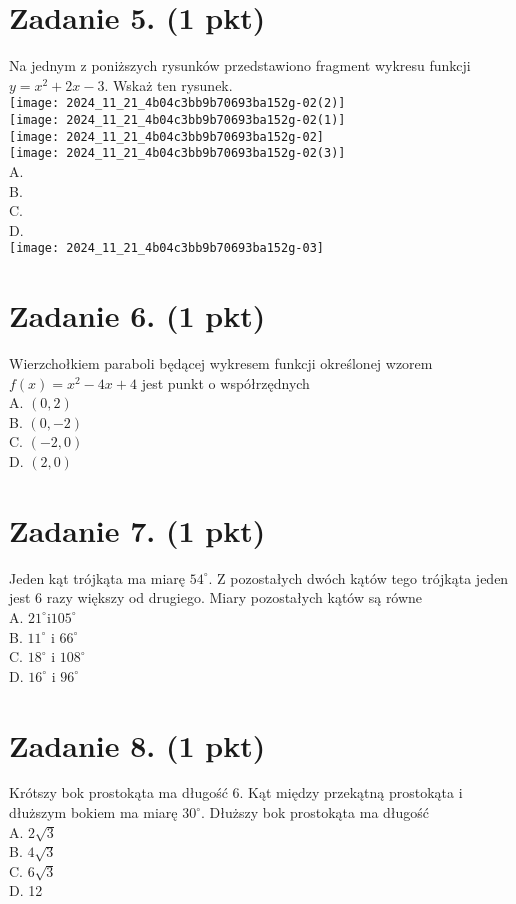 \documentclass[10pt]{article}
\begin{document}
\section*{Zadanie 5. (1 pkt)}
Na jednym z poniższych rysunków przedstawiono fragment wykresu funkcji \(y=x^{2}+2 x-3\). Wskaż ten rysunek.\\
\texttt{[image: 2024\_11\_21\_4b04c3bb9b70693ba152g-02(2)]}\\
\texttt{[image: 2024\_11\_21\_4b04c3bb9b70693ba152g-02(1)]}\\
\texttt{[image: 2024\_11\_21\_4b04c3bb9b70693ba152g-02]}\\
\texttt{[image: 2024\_11\_21\_4b04c3bb9b70693ba152g-02(3)]}\\
A.\\
B.\\
C.\\
D.\\
\texttt{[image: 2024\_11\_21\_4b04c3bb9b70693ba152g-03]}

\section*{Zadanie 6. (1 pkt)}
Wierzchołkiem paraboli będącej wykresem funkcji określonej wzorem \(f(x)=x^{2}-4 x+4\) jest punkt o współrzędnych\\
A. \((0,2)\)\\
B. \((0,-2)\)\\
C. \((-2,0)\)\\
D. \((2,0)\)

\section*{Zadanie 7. (1 pkt)}
Jeden kąt trójkąta ma miarę \(54^{\circ}\). Z pozostałych dwóch kątów tego trójkąta jeden jest 6 razy większy od drugiego. Miary pozostałych kątów są równe\\
A. \(21^{\circ} \mathrm{i} 105^{\circ}\)\\
B. \(11^{\circ}\) i \(66^{\circ}\)\\
C. \(18^{\circ}\) i \(108^{\circ}\)\\
D. \(16^{\circ}\) i \(96^{\circ}\)

\section*{Zadanie 8. (1 pkt)}
Krótszy bok prostokąta ma długość 6. Kąt między przekątną prostokąta i dłuższym bokiem ma miarę \(30^{\circ}\). Dłuższy bok prostokąta ma długość\\
A. \(2 \sqrt{3}\)\\
B. \(4 \sqrt{3}\)\\
C. \(6 \sqrt{3}\)\\
D. 12
\end{document}
